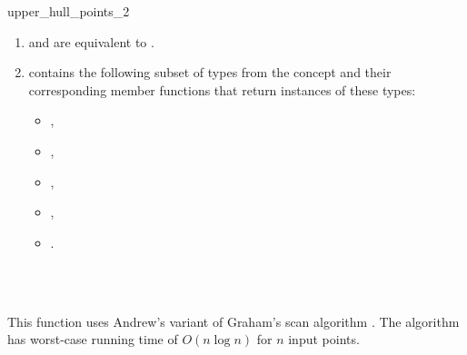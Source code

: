 \begin{ccRefFunction}{upper_hull_points_2}
\begin{enumerate}
   \item    {} and 
            are equivalent to .
   \item    {} contains the following subset of types from
            the concept  and their corresponding member
            functions that return instances of these types:
            \begin{itemize}
                \item {},
		\item {},
                \item {}, 
                \item {},
                \item {}.
            \end{itemize}
\end{enumerate}

\ccSeeAlso

 \\
 \\

\ccImplementation

This function uses Andrew's
variant of Graham's scan algorithm \cite{a-aeach-79,m-mdscg-84}.  The algorithm
has worst-case running time of  $O(n \log n)$ for $n$ input points.

\end{ccRefFunction}


